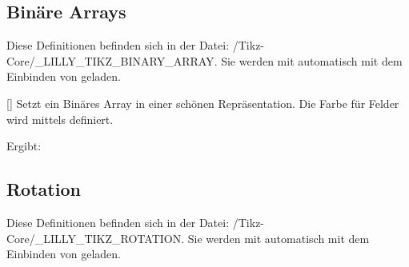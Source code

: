 %
%
%
%
%
%

\subsection{Binäre Arrays}
Diese Definitionen befinden sich in der Datei: {\ltt\LILLYxPATHxGRAPHICS/Tikz-Core/\_LILLY\_TIKZ\_BINARY\_ARRAY}. Sie werden mit  automatisch mit dem Einbinden von\newline {} geladen.

[]
Setzt ein Binäres Array in einer schönen Repräsentation. Die Farbe für  Felder wird mittels  definiert.
\begin{latex*}
\end{latex*}
Ergibt: \begin{center}
\end{center}

%
%
%
%
%
%

\subsection{Rotation}
Diese Definitionen befinden sich in der Datei: {\ltt\LILLYxPATHxGRAPHICS/Tikz-Core/\_LILLY\_TIKZ\_ROTATION}. Sie werden mit  automatisch mit dem Einbinden von\newline {} geladen.

%
%
%

